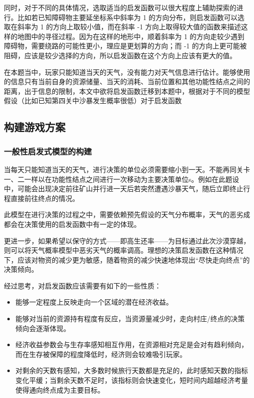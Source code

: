 \documentclass[a4paper]{ctexart}
\begin{document}
同时，对于不同的具体情况，选取适当的启发函数可以很大程度上辅助探索的进行。比如若已知障碍物主要延坐标系中斜率为 1 的方向分布，则启发函数可以选取在斜率为 1 的方向上取较小值，而在斜率 -1 方向上取得较大值的函数来描述这样的地图中的寻径过程。因为在这样的地形中，顺着斜率为 1 的方向走较少遇到障碍物，需要绕路的可能性更小，理应是更划算的方向；而 -1 的方向上更可能被阻碍，应该是较少选择的方向，所以启发函数在这个方向上应该有更大的值。

在本题当中，玩家只能知道当天的天气，没有能力对天气信息进行估计。能够使用的信息只有当前自身的资源储量、当天的消耗、当前位置和其他功能性结点之间的距离，出于信息的限制，本文中欲将启发函数迁移到本题中，根据对于不同的模型假设（比如已知第四关中沙暴发生概率很低）对于启发函数

\subsection{构建游戏方案}

\subsubsection{一般性启发式模型的构建}

当每天只能知道当天的天气，进行决策的单位必须需要缩小到一天。不能再同关卡一、二一样以在功能性结点之间进行一次移动为主要决策单位s。例如在此题设中，可能会出现决定前往矿山并行进一天后若突然遭遇沙暴天气，随后立即终止行程直接前往终点的情况。

此模型在进行决策的过程之中，需要依赖预先假设的天气分布概率，天气的恶劣成都会在决策使用的启发函数中有一定的体现。

更进一步，如果希望以保守的方式——即高生还率——为目标通过此次沙漠穿越，则可以将天气概率模型中恶劣天气的概率调高。理想的决策启发函数在这种情况下，应该对物资的减少更为敏感，随着物资的减少快速地体现出“尽快走向终点”的决策倾向。

经过思考，对启发函数应该需要有如下的一些性质：

\begin{itemize}
    \item 能够一定程度上反映走向一个区域的潜在经济收益。
    \item 能够对当前的资源持有程度有反应，当资源量减少时，走向村庄/终点的决策倾向会逐渐体现。
    \item 经济收益参数会与生存率感知相互作用，在资源相对充足是会对有趋利倾向，而在生存被保障的程度降低时，经济则会较难吸引玩家。
    \item 对剩余的天数有感知，大多数时候旅行天数都是充足的，此时感知天数的指标变化平缓；当剩余天数不足时，该指标则会快速变化，短时间内超越经济考量使得通向终点成为主要目标。
\end{itemize}
\end{document}
